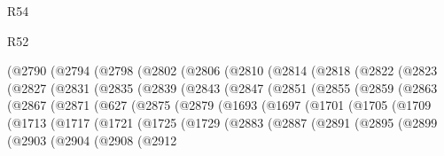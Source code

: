 \begin{lexlean}{R54}
\begin{lexlean}{R52}
\begin{coremodule}
{{{{{{{{{{{{{{{{{{{{{{{{{{{{{{{{{{{{{{{{{{{{{{{{{{{{{{{{{{{{{{{{{{{{{{{{{{{{{{{{{{{{{{{{{{{{{{{{{{{{{{{{{{{{{{{{{{{{{{{{{{{{{{{{{{{{{{{{{{{{{{{{{{{{{{{{{{{{{{{{{{{{{{{{{{{{{{{{{{{{{{{{{{{{{{{{{{{{{{          (@2790
            (@2794
              (@2798
                (@2802
                  (@2806
                    (@2810
                      (@2814
                        (@2818
                          (@2822
                            (@2823
                              (@2827
                                (@2831
                                  (@2835
                                    (@2839
                                      (@2843
                                        (@2847
                                          (@2851
                                            (@2855
                                              (@2859
                                                (@2863
                                                  (@2867
                                                    (@2871
                                                      (@627
                                                        (@2875
                                                          (@2879
                                                            (@1693
                                                              (@1697
                                                                (@1701
                                                                  (@1705
                                                                    (@1709
                                                                      (@1713
                                                                        (@1717
                                                                          (@1721
                                                                            (@1725
                                                                              (@1729
                                                                                (@2883
                                                                                  (@2887
                                                                                    (@2891
                                                                                      (@2895
                                                                                        (@2899
                                                                                          (@2903
                                                                                            (@2904
                                                                                              (@2908
                                                                                                (@2912
}}}}}}}}}}}}}}}}}}}}}}}}}}}}}}}}}}}}}}}}}}}}}}}}}}}}}}}}}}}}}}}}}}}}}}}}}}}}}}}}}}}}}}}}}}}}}}}}}}}}}}}}}}}}}}}}}}}}}}}}}}}}}}}}}}}}}}}}}}}}}}}}}}}}}}}}}}}}}}}}}}}}}}}}}}}}}}}}}}}}}}}}}}}}}}}}}}}}}}
\end{coremodule}
\end{lexlean}
\end{lexlean}

